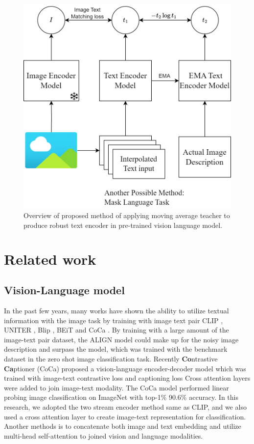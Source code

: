 \documentclass[10pt,twocolumn,letterpaper]{article}
\begin{document}
\begin{figure}[h]
   \label{fig:overall_method}
   \begin{center}
      \includegraphics[width=0.8\linewidth]{Images/ThesisDiagram.png}
   \end{center}
   \caption{Overview of proposed method of applying moving average teacher to produce robust text encoder in pre-trained vision language model.}
   \small
\end{figure}


\section{Related work}

\subsection{Vision-Language model}
In the past few years, many works have shown the ability to utilize textual information with the image task by training with image text pair \eg CLIP \cite{clip}, UNITER \cite{uniter}, Blip \cite{blip-1,blip-2}, BEiT \cite{beit-3} and CoCa \cite{coca}.
By training with a large amount of the image-text pair dataset, the ALIGN model could make up for the noisy image description and surpass the model, which was trained with the benchmark dataset in the zero shot image classification task.
Recently \textbf{Co}ntrastive \textbf{Ca}ptioner (CoCa) \cite{coca} proposed a vision-language encoder-decoder model which was trained with image-text contrastive loss and captioning loss
Cross attention layers were added to join image-text modality.
The CoCa model performed linear probing image classification on ImageNet with top-1\% 90.6\% accuracy.
In this research, we adopted the two stream encoder method same as CLIP, and we also used a cross attention layer to create image-text representation for classification.
Another methods \cite{uniter,beit-3,uniter,vlmo} is to concatenate both image and text embedding and utilize multi-head self-attention to joined vision and language modalities.
\end{document}
